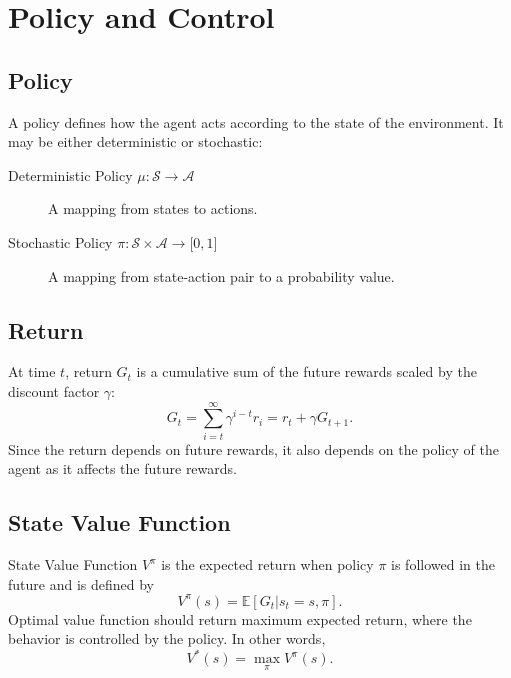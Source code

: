 \section{Policy and Control}
\label{sec:policy_control}

\subsection{Policy}

A policy defines how the agent acts according to the state of the environment. 
It may be either deterministic or stochastic: 

\begin{description}
	\item[Deterministic Policy $\mu \colon \mathcal{S} \rightarrow \mathcal{A}$] 
	A mapping from states to actions.
	\item[Stochastic Policy $\pi \colon \mathcal{S} \times \mathcal{A} \rightarrow \lbrack 0,1 \rbrack$] 
	A mapping from state-action pair to a probability value.
\end{description}

\subsection{Return}

At time $t$, return $G_t$ is a cumulative sum of the future rewards scaled by the discount factor $\gamma$: 
\begin{equation}
\label{eqn:return_dfn}
G_t = \sum_{i=t}^{\infty} \gamma^{i-t} r_i = r_t + \gamma G_{t+1}.
\end{equation}
Since the return depends on future rewards, it also depends on the  policy of the agent as it affects the future rewards.

\subsection{State Value Function}

State Value Function $V^{\pi}$ is the expected return when policy $\pi$ is followed in the future and is defined by
\begin{equation}
V^{\pi}(s) = \mathbb{E}[G_t|s_t=s, \pi]. %
\end{equation}
Optimal value function should return maximum expected return, where 
the behavior is controlled by the policy. 
In other words, 
\begin{equation}
\label{eqn:max_v}
V^{*}(s) = \max_{\pi} V^{\pi}(s).
\end{equation}

